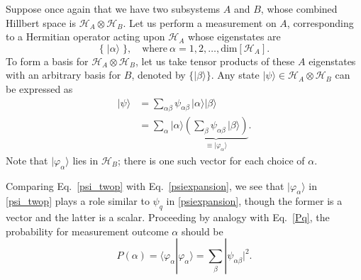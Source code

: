 \documentclass[pra,12pt]{revtex4-2}
\begin{document}
Suppose once again that we have two subsystems $A$ and $B$, whose
combined Hillbert space is $\mathscr{H}_A \otimes \mathscr{H}_B$.  Let
us perform a measurement on $A$, corresponding to a Hermitian operator
acting upon $\mathscr{H}_A$ whose eigenstates are
\begin{equation*}
  \big\{\;|\alpha\rangle\; \big\}, \quad
  \mathrm{where}~\alpha = 1, 2, \dots, \mathrm{dim}\left[\mathscr{H}_A\right].
\end{equation*}
To form a basis for $\mathscr{H}_A \otimes \mathscr{H}_B$, let us take
tensor products of these $A$ eigenstates with an arbitrary basis for
$B$, denoted by $\{|\beta\rangle\}$.  Any state $|\psi\rangle \in
\mathscr{H}_A \otimes \mathscr{H}_B$ can be expressed as
\begin{align}
  |\psi\rangle &= \sum_{\alpha\beta}
  \psi_{\alpha\beta}\, |\alpha\rangle |\beta\rangle \\
  &= \sum_\alpha |\alpha\rangle \underbrace{\left( \sum_\beta \psi_{\alpha\beta}\,|\beta\rangle\right)}_{\displaystyle \equiv |\varphi_\alpha\rangle}.
  \label{psi_twop}
\end{align}
Note that $|\varphi_\alpha\rangle$ lies in $\mathscr{H}_B$; there is
one such vector for each choice of $\alpha$.

Comparing Eq.~\eqref{psi_twop} with Eq.~\eqref{psiexpansion}, we see
that $|\varphi_\alpha\rangle$ in \eqref{psi_twop} plays a role similar
to $\psi_q$ in \eqref{psiexpansion}, though the former is a vector and
the latter is a scalar.  Proceeding by analogy with Eq.~\eqref{Pq},
the probability for measurement outcome $\alpha$ should be
\begin{equation}
  P(\alpha) = \langle\varphi_\alpha|\varphi_\alpha\rangle
  = \sum_\beta |\psi_{\alpha\beta}|^2.
  \label{Palpha0}
\end{equation}
\end{document}
